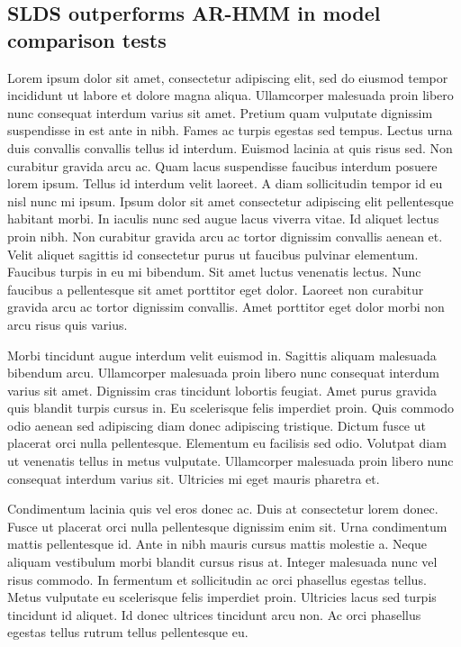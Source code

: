 \subsection{SLDS outperforms AR-HMM in model comparison tests}
\label{sec:slds:3.2.4}

Lorem ipsum dolor sit amet, consectetur adipiscing elit, sed do eiusmod tempor incididunt ut labore et dolore magna aliqua. Ullamcorper malesuada proin libero nunc consequat interdum varius sit amet. Pretium quam vulputate dignissim suspendisse in est ante in nibh. Fames ac turpis egestas sed tempus. Lectus urna duis convallis convallis tellus id interdum. Euismod lacinia at quis risus sed. Non curabitur gravida arcu ac. Quam lacus suspendisse faucibus interdum posuere lorem ipsum. Tellus id interdum velit laoreet. A diam sollicitudin tempor id eu nisl nunc mi ipsum. Ipsum dolor sit amet consectetur adipiscing elit pellentesque habitant morbi. In iaculis nunc sed augue lacus viverra vitae. Id aliquet lectus proin nibh. Non curabitur gravida arcu ac tortor dignissim convallis aenean et. Velit aliquet sagittis id consectetur purus ut faucibus pulvinar elementum. Faucibus turpis in eu mi bibendum. Sit amet luctus venenatis lectus. Nunc faucibus a pellentesque sit amet porttitor eget dolor. Laoreet non curabitur gravida arcu ac tortor dignissim convallis. Amet porttitor eget dolor morbi non arcu risus quis varius.

Morbi tincidunt augue interdum velit euismod in. Sagittis aliquam malesuada bibendum arcu. Ullamcorper malesuada proin libero nunc consequat interdum varius sit amet. Dignissim cras tincidunt lobortis feugiat. Amet purus gravida quis blandit turpis cursus in. Eu scelerisque felis imperdiet proin. Quis commodo odio aenean sed adipiscing diam donec adipiscing tristique. Dictum fusce ut placerat orci nulla pellentesque. Elementum eu facilisis sed odio. Volutpat diam ut venenatis tellus in metus vulputate. Ullamcorper malesuada proin libero nunc consequat interdum varius sit. Ultricies mi eget mauris pharetra et.

Condimentum lacinia quis vel eros donec ac. Duis at consectetur lorem donec. Fusce ut placerat orci nulla pellentesque dignissim enim sit. Urna condimentum mattis pellentesque id. Ante in nibh mauris cursus mattis molestie a. Neque aliquam vestibulum morbi blandit cursus risus at. Integer malesuada nunc vel risus commodo. In fermentum et sollicitudin ac orci phasellus egestas tellus. Metus vulputate eu scelerisque felis imperdiet proin. Ultricies lacus sed turpis tincidunt id aliquet. Id donec ultrices tincidunt arcu non. Ac orci phasellus egestas tellus rutrum tellus pellentesque eu.

